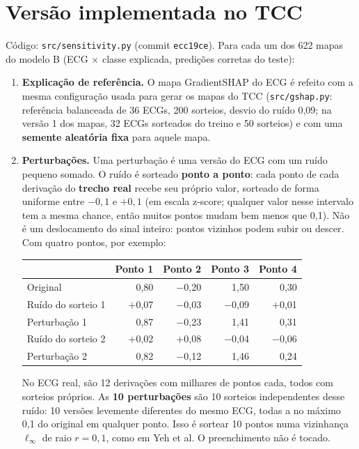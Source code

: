\documentclass[11pt,a4paper]{article}
\begin{document}
\section{Versão implementada no TCC}
Código: \texttt{src/sensitivity.py} (commit \texttt{ecc19ce}). Para cada um dos 622 mapas do modelo B (ECG × classe explicada, predições corretas do teste):
\begin{enumerate}
\item \textbf{Explicação de referência.} O mapa GradientSHAP do ECG é refeito com a mesma configuração usada para gerar os mapas do TCC (\texttt{src/gshap.py}: referência balanceada de 36 ECGs, 200 sorteios, desvio do ruído 0,09; na versão 1 dos mapas, 32 ECGs sorteados do treino e 50 sorteios) e com uma \textbf{semente aleatória fixa} para aquele mapa.
\item \textbf{Perturbações.} Uma perturbação é uma versão do ECG com um ruído pequeno somado. O ruído é sorteado \textbf{ponto a ponto}: cada ponto de cada derivação do \textbf{trecho real} recebe seu próprio valor, sorteado de forma uniforme entre $-0{,}1$ e $+0{,}1$ (em escala z-score; qualquer valor nesse intervalo tem a mesma chance, então muitos pontos mudam bem menos que 0,1). Não é um deslocamento do sinal inteiro: pontos vizinhos podem subir ou descer. Com quatro pontos, por exemplo:
\begin{center}\small
\begin{tabular}{lrrrr}
\toprule
& \textbf{Ponto 1} & \textbf{Ponto 2} & \textbf{Ponto 3} & \textbf{Ponto 4} \\
\midrule
Original & 0,80 & $-$0,20 & 1,50 & 0,30 \\
\addlinespace
Ruído do sorteio 1 & $+$0,07 & $-$0,03 & $-$0,09 & $+$0,01 \\
Perturbação 1 & 0,87 & $-$0,23 & 1,41 & 0,31 \\
\addlinespace
Ruído do sorteio 2 & $+$0,02 & $+$0,08 & $-$0,04 & $-$0,06 \\
Perturbação 2 & 0,82 & $-$0,12 & 1,46 & 0,24 \\
\bottomrule
\end{tabular}
\end{center}
No ECG real, são 12 derivações com milhares de pontos cada, todos com sorteios próprios. As \textbf{10 perturbações} são 10 sorteios independentes desse ruído: 10 versões levemente diferentes do mesmo ECG, todas a no máximo 0,1 do original em qualquer ponto. Isso é sortear 10 pontos numa vizinhança $\ell_\infty$ de raio $r = 0{,}1$, como em Yeh et al. O preenchimento não é tocado.

\end{enumerate}
\end{document}
